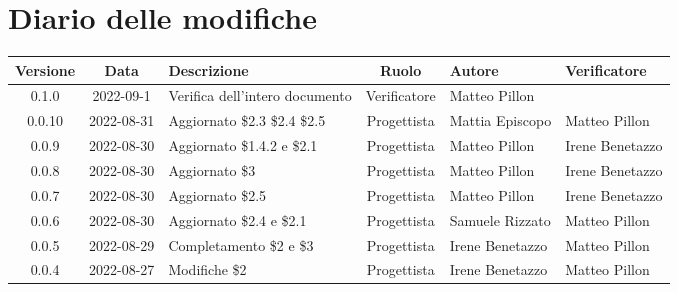 \section*{Diario delle modifiche}
	\begin{center}
	\renewcommand{\arraystretch}{1.8} %
	\begin{longtable}{ |c|c|p{8em}|c|m{5em}|m{6em}| }
	\hline
	\textbf{Versione} & \textbf{Data} & \textbf{Descrizione} &  \textbf{Ruolo} &  \textbf{Autore} & \textbf{Verificatore}\\ %
	\hline %
	0.1.0 & 2022-09-1 & Verifica dell'intero documento & Verificatore & Matteo \newline Pillon & \\ 
	\hline
	0.0.10 & 2022-08-31 & Aggiornato \$2.3 \$2.4 \$2.5 & Progettista & Mattia \newline Episcopo & Matteo \newline Pillon\\ 
	\hline
	0.0.9 & 2022-08-30 & Aggiornato \$1.4.2 e \$2.1 & Progettista & Matteo \newline Pillon & Irene \newline Benetazzo\\ 
	\hline
	0.0.8 & 2022-08-30 & Aggiornato \$3 & Progettista & Matteo \newline Pillon & Irene \newline Benetazzo\\ 
	\hline
	0.0.7 & 2022-08-30 & Aggiornato \$2.5 & Progettista & Matteo \newline Pillon & Irene \newline Benetazzo\\ 
	\hline
	0.0.6 & 2022-08-30 & Aggiornato \$2.4 e \$2.1 & Progettista & Samuele \newline Rizzato & Matteo Pillon \\ 
	\hline
	0.0.5 & 2022-08-29 & Completamento \$2 e \$3 & Progettista & Irene \newline Benetazzo & Matteo \newline Pillon\\ 
	\hline
	0.0.4 & 2022-08-27 & Modifiche \$2 & Progettista & Irene \newline Benetazzo & Matteo \newline Pillon \\ 

\end{longtable}
\end{center}
